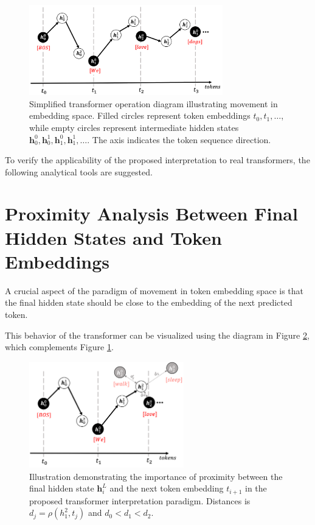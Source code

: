 \begin{figure}[h]
    \centering
    \includegraphics[width=0.75\textwidth]{images/my_transformer_schema_new.png}
    \caption{Simplified transformer operation diagram illustrating movement in embedding space. Filled circles represent token embeddings $t_{0}, t_{1}, \dots$, while empty circles represent intermediate hidden states $\mathbf{h}_0^0, \mathbf{h}_0^1, \mathbf{h}_1^0, \mathbf{h}_1^1, \dots$. The axis indicates the token sequence direction.}
    \label{fig:my_transformer_schema}
\end{figure}

To verify the applicability of the proposed interpretation to real transformers, the following analytical tools are suggested.

\section{Proximity Analysis Between Final Hidden States and Token Embeddings}\label{final_hidden_method}

A crucial aspect of the paradigm of movement in token embedding space is that the final hidden state should be close to the embedding of the next predicted token.

This behavior of the transformer can be visualized using the diagram in Figure \ref{fig:knn_schema}, which complements Figure \ref{fig:my_transformer_schema}.

\begin{figure}[h]
    \centering
    \includegraphics[width=0.6\textwidth]{images/knn_head_new.png}
    \caption{Illustration demonstrating the importance of proximity between the final hidden state $\mathbf{h}_i^L$ and the next token embedding $t_{i+1}$ in the proposed transformer interpretation paradigm. Distances is $d_j = \rho(h_1^2, t_j)$ and $d_0 < d_1 < d_2$.}
    \label{fig:knn_schema}
\end{figure}

